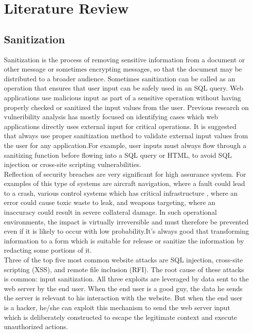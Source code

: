\chapter{Literature Review}

\section{Sanitization}
Sanitization is the process of removing sensitive information from a document or other message or sometimes encrypting messages, so that the document may be distributed to a broader audience. Sometimes sanitization can be called as an operation that ensures that user input can be safely used in an SQL query. Web applications use malicious input as part of a sensitive operation without having properly checked or sanitized the input values from the user. Previous research on vulneribility analysis has mostly focused on identifying cases which web applications directly uses external input for critical operations. It is suggested that always use proper sanitization method to validate external input values from the user for any application.For example, user inputs must always flow through a sanitizing function before flowing into a SQL query or HTML, to avoid SQL injection or cross-site scripting vulnerabilities.\\

Reflection of security breaches are very significant for high assurance system. For examples of this type of systems are aircraft navigation, where a fault could lead to a crash, various control systems which has critical infrastructure , where an error 
could cause toxic waste to leak, and weapons targeting, where an inaccuracy could result in severe collateral damage. In such
operational environments, the impact is virtually irreversible and must therefore be prevented even if it is likely to occur
with low probability.It's always good that transforming information to a form which is suitable for release or sanitize the information by redacting some portions of it.\\

Three of the top five most common website attacks are SQL injection, cross-site scripting (XSS), and remote file inclusion (RFI). The root cause of these attacks is common: input sanitization. All three exploits are leveraged by data sent to the web server by the end user. When the end user is a good guy, the data he sends the server is relevant to his interaction with the website. But when the end user is a hacker, he/she can exploit this mechanism to send the web server input which is deliberately constructed to escape the legitimate context and execute unauthorized actions.\\

